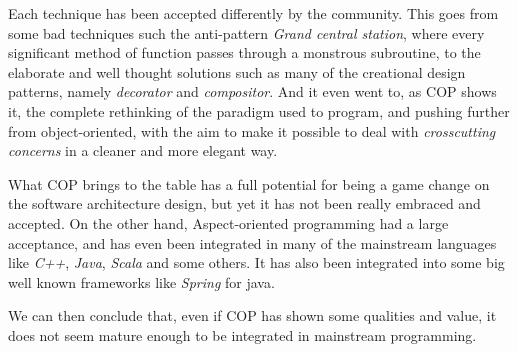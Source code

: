 \documentclass[journal,10pt,compsoc]{IEEEtran}
\begin{document}
Each technique has been accepted differently by the community. This goes from some bad techniques such the anti-pattern \emph{Grand central station}, where every significant method of function
passes through a monstrous subroutine, to the elaborate and well thought solutions such as many of the creational design patterns, namely \emph{decorator} and  \emph{compositor}.
And it even went to, as COP shows it, the complete rethinking of the paradigm used to program, and pushing further from object-oriented, with the aim to make it possible to deal 
with \emph{crosscutting concerns} in a cleaner and more elegant way.

What COP brings to the table has a full potential for being a game change on the software architecture design, but yet it has not been really embraced and accepted. On the other hand,
Aspect-oriented programming had a large acceptance, and has even been integrated in many of the mainstream languages like \emph{C++}, \emph{Java}, \emph{Scala} and some others. It has also been integrated
into some big well known frameworks like \emph{Spring} for java.

We can then conclude that, even if COP has shown some qualities and value, it does not seem mature enough to be integrated in mainstream programming. 










\end{document}
